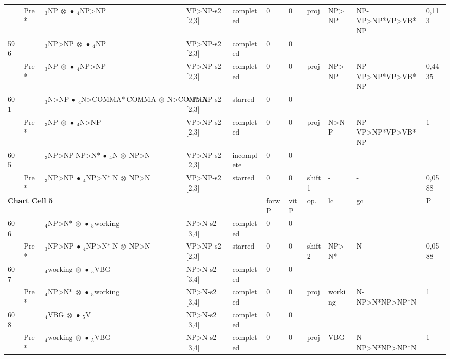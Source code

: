 \documentclass[10pt]{article}
\begin{document}
\begin{longtable}[htbp]{lllllllllll}
 & Pre *& $ {}_3 \textrm{NP} \  \otimes \  \bullet \ {}_{4} \textrm{NP>NP} $ & VP>NP-s2 [2,3] & completed & 0 & 0 & proj & NP>NP & NP-VP>NP*VP>VB*NP & 0,113 \\ 
596 & & $ {}_3 \textrm{NP>NP} \  \otimes \  \bullet \ {}_{4} \textrm{NP} $ & VP>NP-s2 [2,3] & completed & 0 & 0 & & & & \\ 
 & Pre *& $ {}_3 \textrm{NP} \  \otimes \  \bullet \ {}_{4} \textrm{NP>NP} $ & VP>NP-s2 [2,3] & completed & 0 & 0 & proj & NP>NP & NP-VP>NP*VP>VB*NP & 0,4435 \\ 
601 & & $ {}_3 \textrm{N>NP} \  \bullet \ {}_{4} \textrm{N>COMMA*} \ \textrm{COMMA} \  \otimes \ \textrm{N>COMMA} $ & VP>NP-s2 [2,3] & starred & 0 & 0 & & & & \\ 
 & Pre *& $ {}_3 \textrm{NP} \  \otimes \  \bullet \ {}_{4} \textrm{N>NP} $ & VP>NP-s2 [2,3] & completed & 0 & 0 & proj & N>NP & NP-VP>NP*VP>VB*NP & 1 \\ 
605 & & $ {}_3 \textrm{NP>NP} \ \textrm{NP>N*} \  \bullet \ {}_{4} \textrm{N} \  \otimes \ \textrm{NP>N} $ & VP>NP-s2 [2,3] & incomplete & 0 & 0 & & & & \\ 
 & Pre *& $ {}_3 \textrm{NP>NP} \  \bullet \ {}_{4} \textrm{NP>N*} \ \textrm{N} \  \otimes \ \textrm{NP>N} $ & VP>NP-s2 [2,3] & starred & 0 & 0 & shift1 & - & - & 0,0588 \\ 
\hline \multicolumn{5}{l}{\textbf{Chart Cell 5}} & forwP & vitP & op. & lc & gc & P \\ \hline
606 & & $ {}_4 \textrm{NP>N*} \  \otimes \  \bullet \ {}_{5} \textrm{working} $ & NP>N-s2 [3,4] & completed & 0 & 0 & & & & \\ 
 & Pre *& $ {}_3 \textrm{NP>NP} \  \bullet \ {}_{4} \textrm{NP>N*} \ \textrm{N} \  \otimes \ \textrm{NP>N} $ & VP>NP-s2 [2,3] & starred & 0 & 0 & shift2 & NP>N* & N & 0,0588 \\ 
607 & & $ {}_4 \textrm{working} \  \otimes \  \bullet \ {}_{5} \textrm{VBG} $ & NP>N-s2 [3,4] & completed & 0 & 0 & & & & \\ 
 & Pre *& $ {}_4 \textrm{NP>N*} \  \otimes \  \bullet \ {}_{5} \textrm{working} $ & NP>N-s2 [3,4] & completed & 0 & 0 & proj & working & N-NP>N*NP>NP*N & 1 \\ 
608 & & $ {}_4 \textrm{VBG} \  \otimes \  \bullet \ {}_{5} \textrm{V} $ & NP>N-s2 [3,4] & completed & 0 & 0 & & & & \\ 
 & Pre *& $ {}_4 \textrm{working} \  \otimes \  \bullet \ {}_{5} \textrm{VBG} $ & NP>N-s2 [3,4] & completed & 0 & 0 & proj & VBG & N-NP>N*NP>NP*N & 1 \\ 

\end{longtable}
\end{document}
